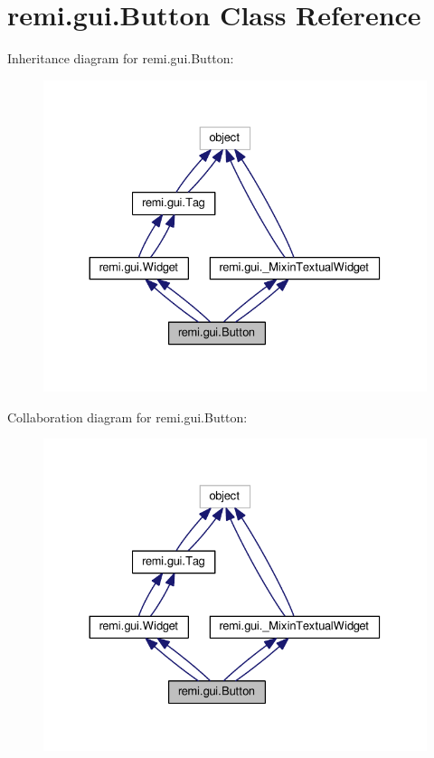 \hypertarget{classremi_1_1gui_1_1Button}{}\section{remi.\+gui.\+Button Class Reference}
\label{classremi_1_1gui_1_1Button}


Inheritance diagram for remi.\+gui.\+Button\+:
\nopagebreak
\begin{figure}[H]
\begin{center}
\leavevmode
\includegraphics[width=330pt]{d5/d6e/classremi_1_1gui_1_1Button__inherit__graph}
\end{center}
\end{figure}


Collaboration diagram for remi.\+gui.\+Button\+:
\nopagebreak
\begin{figure}[H]
\begin{center}
\leavevmode
\includegraphics[width=330pt]{dd/db3/classremi_1_1gui_1_1Button__coll__graph}
\end{center}
\end{figure}
